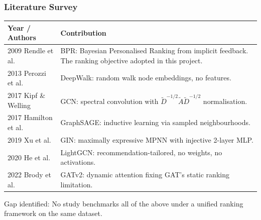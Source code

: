 \documentclass[10pt,aspectratio=43]{beamer}
\begin{document}
\begin{frame}
\frametitle{Literature Survey}
\renewcommand{\arraystretch}{1.6}
\scriptsize
\begin{tabular}{p{2.2cm} p{7.8cm}}
\toprule
\textbf{Year / Authors} & \textbf{Contribution} \\
\midrule
2009 Rendle et al. & BPR: Bayesian Personalised Ranking from implicit feedback. The ranking objective adopted in this project. \\
2013 Perozzi et al. & DeepWalk: random walk node embeddings, no features. \\
2017 Kipf \& Welling & GCN: spectral convolution with $\tilde{D}^{-1/2}\tilde{A}\tilde{D}^{-1/2}$ normalisation. \\
2017 Hamilton et al. & GraphSAGE: inductive learning via sampled neighbourhoods. \\
2019 Xu et al. & GIN: maximally expressive MPNN with injective 2-layer MLP. \\
2020 He et al. & LightGCN: recommendation-tailored, no weights, no activations. \\
2022 Brody et al. & GATv2: dynamic attention fixing GAT's static ranking limitation. \\
\bottomrule
\end{tabular}
\vspace{0.4em}

\alert{Gap identified:} No study benchmarks all of the above under a unified ranking framework on the same dataset.
\end{frame}
\end{document}
